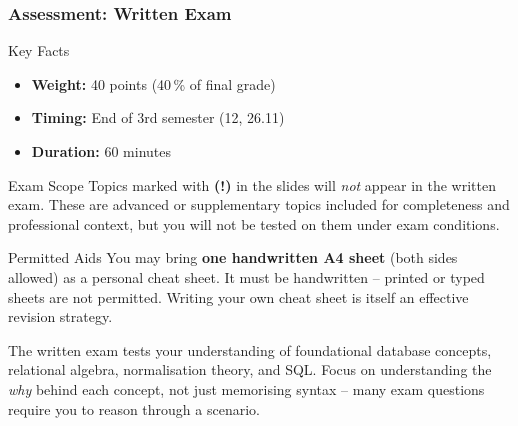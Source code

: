 \begin{frame}
  \frametitle{Assessment: Written Exam}

  \begin{block}{Key Facts}
    \begin{itemize}
      \item \textbf{Weight:} 40 points \quad(40\,\% of final grade)
      \item \textbf{Timing:} End of 3rd semester (12, 26.11)
      \item \textbf{Duration:} 60 minutes
    \end{itemize}
  \end{block}

  \begin{alertblock}{Exam Scope}
    Topics marked with \textbf{(!)} in the slides will \emph{not} appear in the written exam. These are advanced or supplementary topics included for completeness and professional context, but you will not be tested on them under exam conditions.
  \end{alertblock}

  \begin{examples}{Permitted Aids}
    You may bring \textbf{one handwritten A4 sheet} (both sides allowed) as a personal cheat sheet. It must be handwritten -- printed or typed sheets are not permitted. Writing your own cheat sheet is itself an effective revision strategy.
  \end{examples}

  The written exam tests your understanding of foundational database concepts, relational algebra, normalisation theory, and SQL. Focus on understanding the \emph{why} behind each concept, not just memorising syntax -- many exam questions require you to reason through a scenario.
\end{frame}


